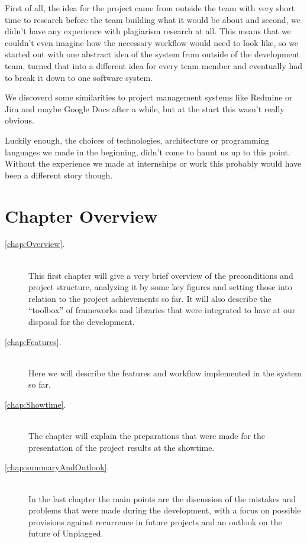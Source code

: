 First of all, the idea for the project came from outside the team with very short time to research before the team building what it would be 
about and second, we didn't have any experience with plagiarism research at all. 
This means that we couldn't even imagine how the necessary workflow would need to look like, so we started out with one abstract idea of the system 
from outside of the development team, turned that into a different idea for every team member and eventually had to break it down to one software system.

We discoverd some similarities to project management systems like Redmine or Jira and maybe Google Docs after a while, but at the start this wasn't really obvious.

Luckily enough, the choices of technologies, architecture or programming languages we made in the beginning, didn't come to haunt us up to this point. Without the experience we made at internships or work this probably would have been a different story though.

\section*{Chapter Overview}

\begin{description}
\item[\ref{chap:Overview}. ] \hfill \\
This first chapter will give a very brief overview of the preconditions and project structure, analyzing it by some key figures and setting those into relation to the project achievements so far. It will also describe the \enquote{toolbox} of
frameworks and libraries that were integrated to have at our disposal for the development.
\item[\ref{chap:Features}. ] \hfill \\
Here we will describe the features and workflow implemented in the system so far.
\item[\ref{chap:Showtime}. ] \hfill \\
The chapter  will explain the preparations that were made for the presentation of the project results at the showtime.
\item[\ref{chap:summaryAndOutlook}. ] \hfill \\
In the last chapter the main points are the discussion of the mistakes and
problems that were made during the development, with a focus on possible provisions against recurrence in future projects and an
outlook on the future of Unplagged.
\end{description}

